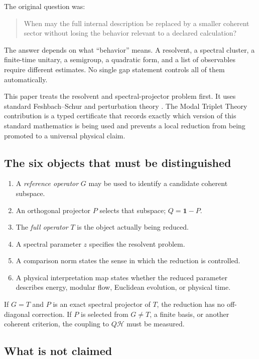 \documentclass[11pt]{article}
\theoremstyle{definition}
\theoremstyle{remark}
\newcommand{\cH}{\mathcal H}
\newcommand{\1}{\mathbf 1}
\newcommand{\MTT}{Modal Triplet Theory}
\begin{document}
The original question was:
\begin{quote}
When may the full internal description be replaced by a smaller coherent
sector without losing the behavior relevant to a declared calculation?
\end{quote}
The answer depends on what ``behavior'' means.  A resolvent, a spectral
cluster, a finite-time unitary, a semigroup, a quadratic form, and a list
of observables require different estimates.  No single gap statement
controls all of them automatically.

This paper treats the resolvent and spectral-projector problem first.  It
uses standard Feshbach--Schur and perturbation theory
\cite{Feshbach1962,Kato1995,GriesemerHasler2008}.  The \MTT{} contribution
is a typed certificate that records exactly which version of this standard
mathematics is being used and prevents a local reduction from being
promoted to a universal physical claim.

\subsection{The six objects that must be distinguished}

\begin{enumerate}[leftmargin=2em]
\item A \emph{reference operator} \(G\) may be used to identify a candidate
      coherent subspace.
\item An orthogonal projector \(P\) selects that subspace; \(Q=\1-P\).
\item The \emph{full operator} \(T\) is the object actually being reduced.
\item A spectral parameter \(z\) specifies the resolvent problem.
\item A comparison norm states the sense in which the reduction is
      controlled.
\item A physical interpretation map states whether the reduced parameter
      describes energy, modular flow, Euclidean evolution, or physical
      time.
\end{enumerate}

If \(G=T\) and \(P\) is an exact spectral projector of \(T\), the reduction
has no off-diagonal correction.  If \(P\) is selected from \(G\neq T\), a
finite basis, or another coherent criterion, the coupling to \(Q\cH\)
must be measured.

\subsection{What is not claimed}
\end{document}
